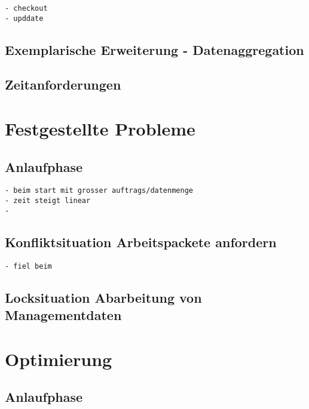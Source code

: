 \begin{verbatim}
- checkout
- upddate
\end{verbatim}

\subsection{Exemplarische Erweiterung - Datenaggregation}

\subsection{Zeitanforderungen}

\section{Festgestellte Probleme}
\subsection{Anlaufphase}

\begin{verbatim}
- beim start mit grosser auftrags/datenmenge
- zeit steigt linear
- 

\end{verbatim}

\subsection{Konfliktsituation Arbeitspackete anfordern}

\begin{verbatim}
- fiel beim
\end{verbatim}



\subsection{Locksituation Abarbeitung von Managementdaten}

\section{Optimierung}

\subsection{Anlaufphase}
